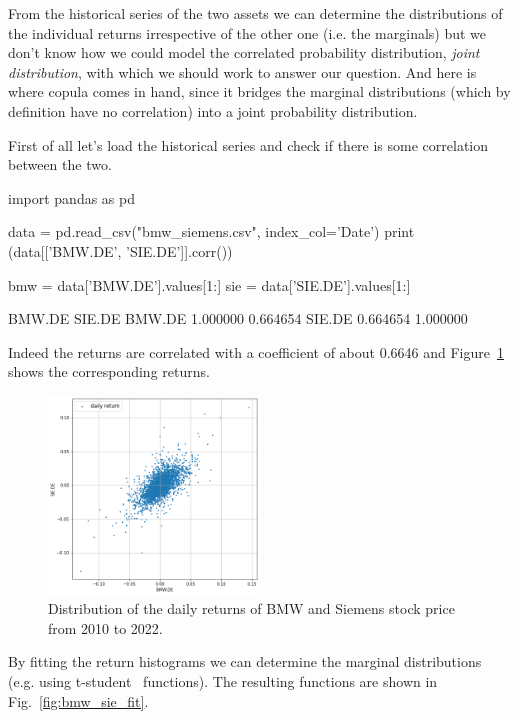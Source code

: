 From the historical series of the two assets we can determine the distributions of the individual returns irrespective of the other one (i.e. the marginals) but we don't know how we could model the correlated probability distribution, \emph{joint distribution}, with which we should work to answer our question. And here is where copula comes in hand, since it bridges the marginal distributions (which by definition have no correlation) into a joint probability distribution. 

First of all let's load the historical series and check if there is some correlation between the two.

\begin{ipython}
import pandas as pd

data = pd.read_csv("bmw_siemens.csv", index_col='Date')
print (data[['BMW.DE', 'SIE.DE']].corr())

bmw = data['BMW.DE'].values[1:]
sie = data['SIE.DE'].values[1:]
\end{ipython}
\begin{ioutput}
          BMW.DE    SIE.DE
BMW.DE  1.000000  0.664654
SIE.DE  0.664654  1.000000
\end{ioutput}
Indeed the returns are correlated with a coefficient of about 0.6646 and Figure~\ref{fig:bmw_sie_returns} shows the corresponding returns.

\begin{figure}[htbp]
\centering
\includegraphics[width=0.5\textwidth]{figures/bmw_sie_daily_returns}
\caption{Distribution of the daily returns of BMW and Siemens stock price from 2010 to 2022.}
\label{fig:bmw_sie_returns}
\end{figure}

By fitting the return histograms we can determine the marginal distributions (e.g. using t-student~\cite{bib:t_student} functions).
The resulting functions are shown in Fig.~\ref{fig:bmw_sie_fit}.

